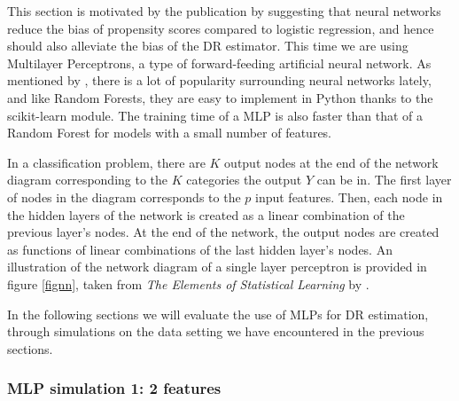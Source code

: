 \documentclass[12pt,twoside]{article}
\begin{document}
This section is motivated by the publication by \citet{setoguchi-nn} suggesting that neural networks reduce the bias of propensity scores compared to logistic regression, and hence should also alleviate the bias of the DR estimator. This time we are using Multilayer Perceptrons, a type of forward-feeding artificial neural network. As mentioned by \citet{hastieESL}, there is a lot of popularity surrounding neural networks lately, and like Random Forests, they are easy to implement in Python thanks to the scikit-learn module. The training time of a MLP is also faster than that of a Random Forest for models with a small number of features. 

In a classification problem, there are $K$ output nodes at the end of the network diagram corresponding to the $K$ categories the output $Y$ can be in. The first layer of nodes in the diagram corresponds to the $p$ input features. Then, each node in the hidden layers of the network is created as a linear combination of the previous layer's nodes. At the end of the network, the output nodes are created as functions of linear combinations of the last hidden layer's nodes. An illustration of the network diagram of a single layer perceptron is provided in figure \ref{fignn}, taken from \textit{The Elements of Statistical Learning} by \citet{hastieESL}.

In the following sections we will evaluate the use of MLPs for DR estimation, through simulations on the data setting we have encountered in the previous sections.

\subsubsection{MLP simulation 1: 2 features}
\end{document}
